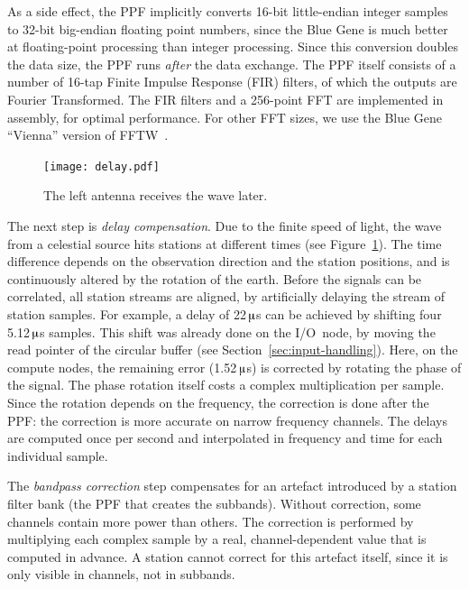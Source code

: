 \documentclass{sig-alternate}
\newcommand{\us}{\,$\muup$s\xspace}
\begin{document}
As a side effect, the PPF implicitly converts 16-bit little-endian integer
samples to 32-bit big-endian floating point numbers, since the Blue Gene is
much better at floating-point processing than integer processing.
Since this conversion doubles the data size, the PPF runs \emph{after\/} the
data exchange.
The PPF itself consists of a number of 16-tap Finite Impulse Response (FIR)
filters, of which the outputs are Fourier Transformed.
The FIR filters and a 256-point FFT are implemented in assembly, for optimal
performance.
For other FFT sizes, we use the Blue Gene ``Vienna'' version of
FFTW~\cite{Lorenz:05}.


\begin{figure}[ht]
\begin{center}
\texttt{[image: delay.pdf]}
\end{center}
\caption{The left antenna receives the wave later.}
\label{fig:delay}
\end{figure}

The next step is \emph{delay compensation}.
Due to the finite speed of light, the wave from a celestial source hits
stations at different times (see Figure~\ref{fig:delay}).
The time difference depends on the observation direction and the
station positions, and is continuously altered by the rotation of the earth.
Before the signals can be correlated, all station streams are aligned,
by artificially delaying the stream of station samples.
For example, a delay of 22\us can be achieved by shifting four 5.12\us
samples.
This shift was already done on the I/O~node, by moving the read pointer
of the circular buffer (see Section~\ref{sec:input-handling}).
Here, on the compute nodes, the remaining error (1.52\us) is corrected by
rotating the phase of the signal.
The phase rotation itself costs a complex multiplication per sample.
Since the rotation depends on the frequency, the correction is done after 
the PPF: the correction is more accurate on narrow frequency channels.
The delays are computed once per second and interpolated in frequency
and time for each individual sample.

The \emph{bandpass correction} step compensates for an artefact
introduced by a station filter bank (the PPF that creates the subbands).
Without correction, some channels contain more power than others.
The correction is performed by multiplying each complex sample by a real,
channel-dependent value that is computed in advance.
A station cannot correct for this artefact itself, since it is only visible
in channels, not in subbands.
\end{document}
